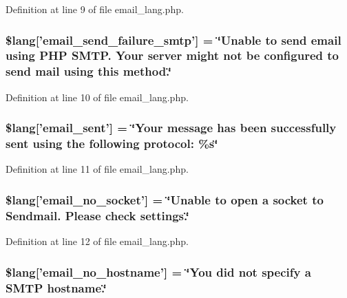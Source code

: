 Definition at line 9 of file email\-\_\-lang.\-php.

\hypertarget{email__lang_8php_a37e19fc7057ba5d5300dd3e83cefc5a2}{
\subsubsection[{\$lang}]{\setlength{\rightskip}{0pt plus 5cm}\$lang\mbox{[}'email\-\_\-send\-\_\-failure\-\_\-smtp'\mbox{]} = \char`\"{}Unable {\bf to} send email using P\-H\-P S\-M\-T\-P. Your server might {\bf not} be configured {\bf to} send mail using this method.\char`\"{}}}\label{email__lang_8php_a37e19fc7057ba5d5300dd3e83cefc5a2}


Definition at line 10 of file email\-\_\-lang.\-php.

\hypertarget{email__lang_8php_a7e5c67019fdffb596af1af5a94247ba9}{
\subsubsection[{\$lang}]{\setlength{\rightskip}{0pt plus 5cm}\$lang\mbox{[}'email\-\_\-sent'\mbox{]} = \char`\"{}Your message has been successfully sent using the following protocol\-: \%s\char`\"{}}}\label{email__lang_8php_a7e5c67019fdffb596af1af5a94247ba9}


Definition at line 11 of file email\-\_\-lang.\-php.

\hypertarget{email__lang_8php_a78f8be783ca93e91af775994ddc87cb7}{
\subsubsection[{\$lang}]{\setlength{\rightskip}{0pt plus 5cm}\$lang\mbox{[}'email\-\_\-no\-\_\-socket'\mbox{]} = \char`\"{}Unable {\bf to} open {\bf a} socket {\bf to} Sendmail. Please check settings.\char`\"{}}}\label{email__lang_8php_a78f8be783ca93e91af775994ddc87cb7}


Definition at line 12 of file email\-\_\-lang.\-php.

\hypertarget{email__lang_8php_a03905b414e05a5d3cfd0fe88868615f5}{
\subsubsection[{\$lang}]{\setlength{\rightskip}{0pt plus 5cm}\$lang\mbox{[}'email\-\_\-no\-\_\-hostname'\mbox{]} = \char`\"{}You did {\bf not} specify {\bf a} S\-M\-T\-P hostname.\char`\"{}}}\label{email__lang_8php_a03905b414e05a5d3cfd0fe88868615f5}


